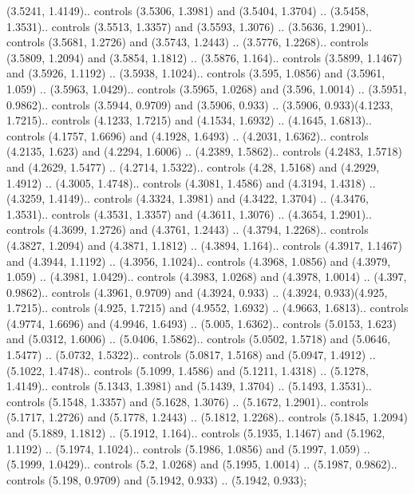 (3.5241, 1.4149).. controls (3.5306, 1.3981) and (3.5404, 1.3704) .. (3.5458, 1.3531).. controls (3.5513, 1.3357) and (3.5593, 1.3076) .. (3.5636, 1.2901).. controls (3.5681, 1.2726) and (3.5743, 1.2443) .. (3.5776, 1.2268).. controls (3.5809, 1.2094) and (3.5854, 1.1812) .. (3.5876, 1.164).. controls (3.5899, 1.1467) and (3.5926, 1.1192) .. (3.5938, 1.1024).. controls (3.595, 1.0856) and (3.5961, 1.059) .. (3.5963, 1.0429).. controls (3.5965, 1.0268) and (3.596, 1.0014) .. (3.5951, 0.9862).. controls (3.5944, 0.9709) and (3.5906, 0.933) .. (3.5906, 0.933)(4.1233, 1.7215).. controls (4.1233, 1.7215) and (4.1534, 1.6932) .. (4.1645, 1.6813).. controls (4.1757, 1.6696) and (4.1928, 1.6493) .. (4.2031, 1.6362).. controls (4.2135, 1.623) and (4.2294, 1.6006) .. (4.2389, 1.5862).. controls (4.2483, 1.5718) and (4.2629, 1.5477) .. (4.2714, 1.5322).. controls (4.28, 1.5168) and (4.2929, 1.4912) .. (4.3005, 1.4748).. controls (4.3081, 1.4586) and (4.3194, 1.4318) .. (4.3259, 1.4149).. controls (4.3324, 1.3981) and (4.3422, 1.3704) .. (4.3476, 1.3531).. controls (4.3531, 1.3357) and (4.3611, 1.3076) .. (4.3654, 1.2901).. controls (4.3699, 1.2726) and (4.3761, 1.2443) .. (4.3794, 1.2268).. controls (4.3827, 1.2094) and (4.3871, 1.1812) .. (4.3894, 1.164).. controls (4.3917, 1.1467) and (4.3944, 1.1192) .. (4.3956, 1.1024).. controls (4.3968, 1.0856) and (4.3979, 1.059) .. (4.3981, 1.0429).. controls (4.3983, 1.0268) and (4.3978, 1.0014) .. (4.397, 0.9862).. controls (4.3961, 0.9709) and (4.3924, 0.933) .. (4.3924, 0.933)(4.925, 1.7215).. controls (4.925, 1.7215) and (4.9552, 1.6932) .. (4.9663, 1.6813).. controls (4.9774, 1.6696) and (4.9946, 1.6493) .. (5.005, 1.6362).. controls (5.0153, 1.623) and (5.0312, 1.6006) .. (5.0406, 1.5862).. controls (5.0502, 1.5718) and (5.0646, 1.5477) .. (5.0732, 1.5322).. controls (5.0817, 1.5168) and (5.0947, 1.4912) .. (5.1022, 1.4748).. controls (5.1099, 1.4586) and (5.1211, 1.4318) .. (5.1278, 1.4149).. controls (5.1343, 1.3981) and (5.1439, 1.3704) .. (5.1493, 1.3531).. controls (5.1548, 1.3357) and (5.1628, 1.3076) .. (5.1672, 1.2901).. controls (5.1717, 1.2726) and (5.1778, 1.2443) .. (5.1812, 1.2268).. controls (5.1845, 1.2094) and (5.1889, 1.1812) .. (5.1912, 1.164).. controls (5.1935, 1.1467) and (5.1962, 1.1192) .. (5.1974, 1.1024).. controls (5.1986, 1.0856) and (5.1997, 1.059) .. (5.1999, 1.0429).. controls (5.2, 1.0268) and (5.1995, 1.0014) .. (5.1987, 0.9862).. controls (5.198, 0.9709) and (5.1942, 0.933) .. (5.1942, 0.933);



